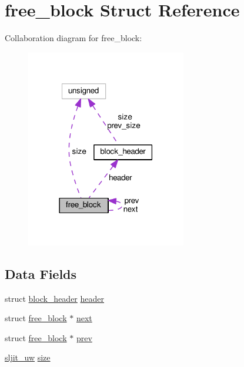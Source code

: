 \hypertarget{structfree__block}{}\section{free\+\_\+block Struct Reference}
\label{structfree__block}


Collaboration diagram for free\+\_\+block\+:
\nopagebreak
\begin{figure}[H]
\begin{center}
\leavevmode
\includegraphics[width=198pt]{structfree__block__coll__graph}
\end{center}
\end{figure}
\subsection*{Data Fields}
\begin{DoxyCompactItemize}
\item 
struct \hyperlink{structblock__header}{block\+\_\+header} \hyperlink{structfree__block_a7c325e0fbf4788e55ee69e9014c89399}{header}
\item 
struct \hyperlink{structfree__block}{free\+\_\+block} $\ast$ \hyperlink{structfree__block_a9b209321b0d2d74936310fac046be7b5}{next}
\item 
struct \hyperlink{structfree__block}{free\+\_\+block} $\ast$ \hyperlink{structfree__block_a701ae4510142c228d5165e74ffd32c45}{prev}
\item 
\hyperlink{sljitConfigInternal_8h_a4f2aa7461612a199a0e3fd93cd9a4d02}{sljit\+\_\+uw} \hyperlink{structfree__block_accf7fcad60c2eb887c41897b66281db2}{size}
\end{DoxyCompactItemize}


